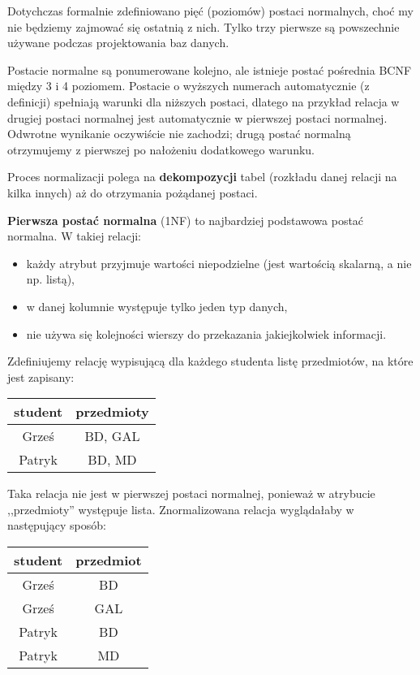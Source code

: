Dotychczas formalnie zdefiniowano pięć (poziomów) postaci normalnych, choć my nie będziemy zajmować się ostatnią z nich. Tylko trzy pierwsze są powszechnie używane podczas projektowania baz danych.

Postacie normalne są ponumerowane kolejno, ale istnieje postać pośrednia BCNF między 3 i 4 poziomem. Postacie o wyższych numerach automatycznie (z definicji) spełniają warunki dla niższych postaci, dlatego na przykład relacja w drugiej postaci normalnej jest automatycznie w pierwszej postaci normalnej. Odwrotne wynikanie oczywiście nie zachodzi; drugą postać normalną otrzymujemy z pierwszej po nałożeniu dodatkowego warunku.

Proces normalizacji polega na \textbf{dekompozycji} tabel (rozkładu danej relacji na kilka innych) aż do otrzymania pożądanej postaci.
\bigskip

\textbf{Pierwsza postać normalna} (1NF) to najbardziej podstawowa postać normalna. W takiej relacji:
\begin{itemize}
	\item każdy atrybut przyjmuje wartości niepodzielne (jest wartością skalarną, a nie np. listą),
	\item w danej kolumnie występuje tylko jeden typ danych,
    \item nie używa się kolejności wierszy do przekazania jakiejkolwiek informacji.
\end{itemize}

\begin{example}
Zdefiniujemy relację wypisującą dla każdego studenta listę przedmiotów, na które jest zapisany:
\begin{center}
    \begin{tabular}{c|c}
     student & przedmioty \\
     \hline
     Grześ & BD, GAL \\
     Patryk & BD, MD  \\
    \end{tabular}
\end{center}
Taka relacja nie jest w pierwszej postaci normalnej, ponieważ w atrybucie ,,przedmioty'' występuje lista. Znormalizowana relacja wyglądałaby w następujący sposób:
\begin{center}
    \begin{tabular}{c|c}
     student & przedmiot \\
     \hline
     Grześ & BD \\
     Grześ & GAL \\
     Patryk & BD \\
     Patryk & MD \\
    \end{tabular}
\end{center}
\end{example}

